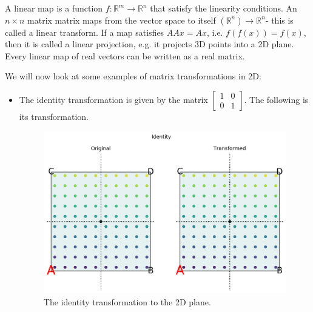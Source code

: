 \documentclass[a4paper, openany]{memoir}
\begin{document}
    A linear map is a function $f: \mathbb{R}^m \to \mathbb{R}^n$ that satisfy the linearity conditions. An $n \times n$ matrix matrix maps from the vector space to itself $(\mathbb{R}^n) \to \mathbb{R}^n$- this is called a linear transform. If a map satisfies $AAx = Ax$, i.e. $f(f(x)) = f(x)$, then it is called a linear projection, e.g. it projects 3D points into a 2D plane. Every linear map of real vectors can be written as a real matrix.

    We will now look at some examples of matrix transformations in 2D:
    \begin{itemize}
        \item The identity transformation is given by the matrix $\begin{bmatrix}
            1 & 0 \\
            0 & 1
        \end{bmatrix}$. The following is its transformation.
        \begin{figure}[H]
            \centering
            \includegraphics[scale=0.5]{src/3.10 IdentityTransformation.png}
            \caption{The identity transformation to the 2D plane.}
        \end{figure}    
        

\end{itemize}
\end{document}
